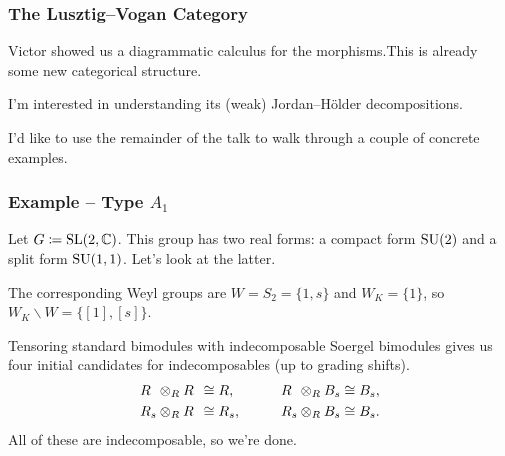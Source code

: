 \documentclass{beamer}
\begin{document}
\begin{frame}
\frametitle{The Lusztig--Vogan Category}
\noindent Victor showed us a diagrammatic calculus for the morphisms.\newline This is already some new categorical structure.\newline

\noindent I'm interested in understanding its \textcolor{structure}{(weak) Jordan--H\"{o}lder decompositions}.\newline

\noindent I'd like to use the remainder of the talk to walk through a couple of concrete examples.
\end{frame}

\begin{frame}
\frametitle{Example -- Type $A_1$}
\noindent Let $G \coloneqq \textup{SL}(2, \mathbb{C})$. This group has two real forms: a compact form $\textup{SU}(2)$ and a split form $\textup{SU}(1, 1)$. Let's look at the latter.\newline

\noindent The corresponding Weyl groups are $W = S_2 = \{1, s\}$ and $W_K = \{1\}$, so $W_K\backslash W = \{[1], [s]\}$.\newline

\noindent Tensoring standard bimodules with indecomposable Soergel bimodules gives us four initial candidates for indecomposables (up to grading shifts).
\begin{alignat*}{2}
R\hphantom{{}_{s}} \otimes_R R\hphantom{{}_{s}} &\cong R,&\qquad R\hphantom{{}_{s}} \otimes_R B_{s} &\cong B_{s},\\
R_{s} \otimes_R R\hphantom{{}_{s}} &\cong R_{s},&\qquad R_{s} \otimes_R B_{s} &\cong B_{s}.
\end{alignat*}
\noindent All of these are indecomposable, so we're done.
\end{frame}
\end{document}
